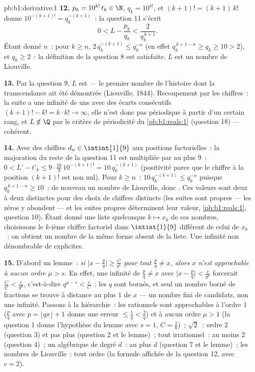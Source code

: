 \begin{solution}{pb:b1:derivative:1}
\textbf{12.} $p_k = 10^{k!}\,t_k \in \N$, $q_k = 10^{k!}$, et
$(k+1)! = (k+1)\,k!$ donne $10^{-(k+1)!} = q_k^{-(k+1)}$~:
la question 11 s'écrit
\[
0 < L - \frac{p_k}{q_k} < \frac{2}{q_k^{\,k+1}} .
\]
Étant donné $n$~: pour $k \geq n$, $2\,q_k^{-(k+1)} \leq q_k^{-n}$
(en effet $q_k^{\,k+1-n} \geq q_k \geq 10 > 2$), et $q_k \geq 2$~:
la définition de la question 8 est satisfaite. $L$ est un nombre de Liouville.

\textbf{13.} Par la question 9, $L$ est  --- le premier
nombre de l'histoire dont la transcendance ait été démontrée (Liouville, 1844).
Recoupement par les chiffres~: la suite a une infinité de uns avec des
écarts consécutifs $(k+1)! - k! = k\cdot k! \to \infty$, elle n'est donc
pas périodique à partir d'un certain rang, et $L \notin \Q$ par le critère
de périodicité du \cref{pb:b1:reals:1} (question 18) --- cohérent.

\textbf{14.} Avec des chiffres $d_n \in \intint{1}{9}$ aux
positions factorielles~: la majoration du reste de la question 11 est multipliée par au
plus $9$~: $0 < L' - t'_k \leq 9\cdot\frac{10}{9}\,10^{-(k+1)!} =
10\,q_k^{-(k+1)}$ (positivité parce que le chiffre à la position
$(k+1)!$ est non nul). Pour $k \geq n$~: $10\,q_k^{-(k+1)} \leq
q_k^{-n}$ puisque $q_k^{\,k+1-n} \geq 10$~: de nouveau un nombre de
Liouville, donc . Ces valeurs sont deux à deux
distinctes pour des choix de chiffres distincts (les suites sont propres ---
les zéros y abondent --- et les suites propres déterminent leur valeur,
\cref{pb:b1:reals:1}, question 10). Étant donné une liste quelconque $k \mapsto
x_k$ de ces nombres, choisissons le $k$-ième chiffre factoriel dans
$\intint{1}{9}$ différent de celui de $x_k$~: on obtient un nombre de
la même forme absent de la liste. Une infinité non dénombrable de
 explicites.

\textbf{15.} D'abord un lemme~: \emph{si $\bigl|x - \frac pq\bigr|
\geq \frac{C}{q^s}$ pour tout $\frac pq \neq x$, alors $x$ n'est
approchable à aucun ordre $\mu > s$.} En effet, une infinité de
$\frac pq \neq x$ avec $\bigl|x - \frac pq\bigr| <
\frac{c}{q^\mu}$ forcerait $\frac{C}{q^s} < \frac{c}{q^\mu}$,
c'est-à-dire $q^{\mu - s} < \frac cC$~: les $q$ sont bornés, et seul un nombre
borné de fractions se trouve à distance au plus $1$ de $x$ ---
un nombre fini de candidats, non une infinité. Passons à la
hiérarchie~: les rationnels sont approchables à l'ordre $1$ ($\frac
pq$ avec $p = \lfloor qx\rfloor + 1$ donne une erreur $\leq \frac1q <
\frac2q$) et à aucun ordre $\mu > 1$ (la question 1 donne
l'hypothèse du lemme avec $s = 1$, $C = \frac1b$)~; $\sqrt2$~:
ordre $2$ (question 3) et pas plus (question 2 et le lemme)~;
tout irrationnel~: au moins $2$ (question 4)~; un algébrique de degré
$d$~: au plus $d$ (question 7 et le lemme)~; les nombres de Liouville~:
tout ordre (la formule affichée de la question 12, avec $c = 2$).


\end{solution}
